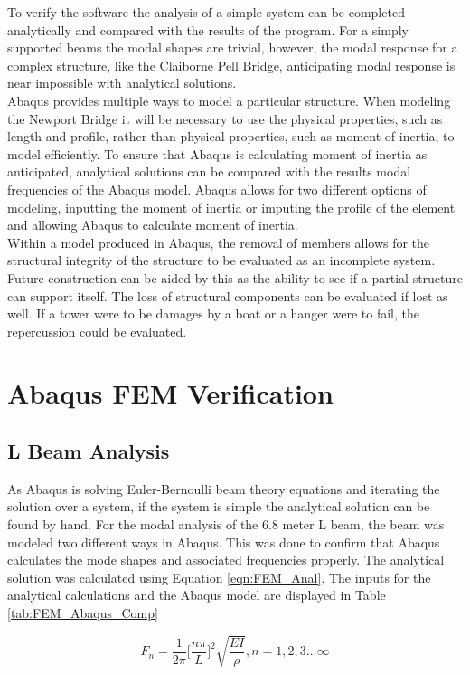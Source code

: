 \indent To verify the software the analysis of a simple system can be completed analytically and compared with the results of the program. For a simply
supported beams the modal shapes are trivial, however, the modal response for a complex structure, like the Claiborne Pell Bridge, anticipating modal
response is near impossible with analytical solutions. \\
\indent Abaqus provides multiple ways to model a particular structure. When modeling the Newport Bridge it will be necessary to use the physical
properties, such as length and profile, rather than physical properties, such as moment of inertia, to model efficiently. To ensure that Abaqus is
calculating moment of inertia as anticipated, analytical solutions can be compared with the results modal frequencies of the Abaqus model. Abaqus allows
for two different options of modeling, inputting the moment of inertia or imputing the profile of the element and allowing Abaqus to calculate moment
of inertia. \\
\indent Within a model produced in Abaqus, the removal of members allows for the structural integrity of the structure to be evaluated as an incomplete
system. Future construction can be aided by this as the ability to see if a partial structure can support itself. The loss of structural components can
be evaluated if lost as well. If a tower were to be damages by a boat or a hanger were to fail, the repercussion could be evaluated. 

\section{Abaqus FEM Verification}

\subsection{L Beam Analysis}

As Abaqus is solving Euler-Bernoulli beam theory equations and iterating the solution over a system, if the system is simple the analytical solution can be
found by hand. For the modal analysis of the 6.8 meter L beam, the beam was modeled two different ways in Abaqus. This was done to confirm that Abaqus
calculates the mode shapes and associated frequencies properly.
The analytical solution was calculated using Equation \ref{eqn:FEM_Anal}.
The inputs for the analytical calculations and the Abaqus model are displayed in Table \ref{tab:FEM_Abaqus_Comp}

\begin{equation}
F_{n} = \frac{1}{2\pi} \biggl[ \frac{n \pi}{L} \biggr ]^{2} \sqrt{\frac{EI}{\rho}}, n=1,2,3 \dots \infty
\label{eqn:FEM_Anal}
\end{equation}

